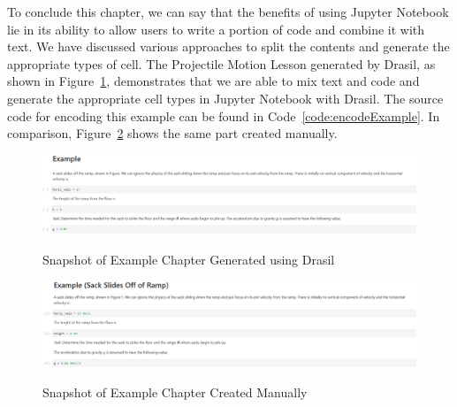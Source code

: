 To conclude this chapter, we can say that the benefits of using Jupyter 
Notebook lie in its ability to allow users to write a portion of code and 
combine it with text. We have discussed various approaches to split the 
contents and generate the appropriate types of cell. The Projectile Motion 
Lesson generated by Drasil, as shown in Figure~\ref{fig:example_drasil}, 
demonstrates that we are able to mix text and code and generate the appropriate 
cell types in Jupyter Notebook with Drasil. The source code for encoding this 
example can be found in Code~\ref{code:encodeExample}. In comparison, 
Figure~\ref{fig:example_manual} shows the same part created manually.

\begin{figure}[h!]
	\caption{Snapshot of Example Chapter Generated using Drasil}
	\includegraphics[width=1\textwidth]{figures/example_drasil.png}
	\label{fig:example_drasil}
\end{figure}

\begin{figure}[h!]
	\caption{Snapshot of Example Chapter Created Manually}
	\includegraphics[width=1\textwidth]{figures/example_manual.png}
	\label{fig:example_manual}
\end{figure}

